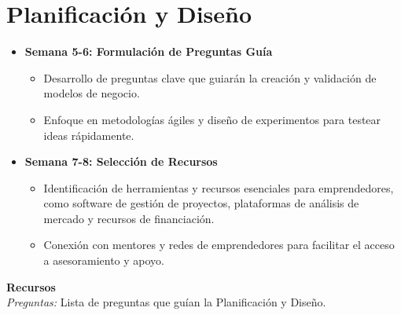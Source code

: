 \section{Planificación y Diseño}
\begin{itemize}
  \item \textbf{Semana 5-6: Formulación de Preguntas Guía}
  \begin{itemize}
    \item Desarrollo de preguntas clave que guiarán la creación y validación de modelos de negocio.
    \item Enfoque en metodologías ágiles y diseño de experimentos para testear ideas rápidamente.
  \end{itemize}
  \item \textbf{Semana 7-8: Selección de Recursos}
  \begin{itemize}
    \item Identificación de herramientas y recursos esenciales para emprendedores, como software de gestión de proyectos, plataformas de análisis de mercado y recursos de financiación.
    \item Conexión con mentores y redes de emprendedores para facilitar el acceso a asesoramiento y apoyo.
  \end{itemize}
\end{itemize}
{\large \textbf{Recursos}}\\
\textit{Preguntas:} Lista de preguntas que guían la Planificación y Diseño.
